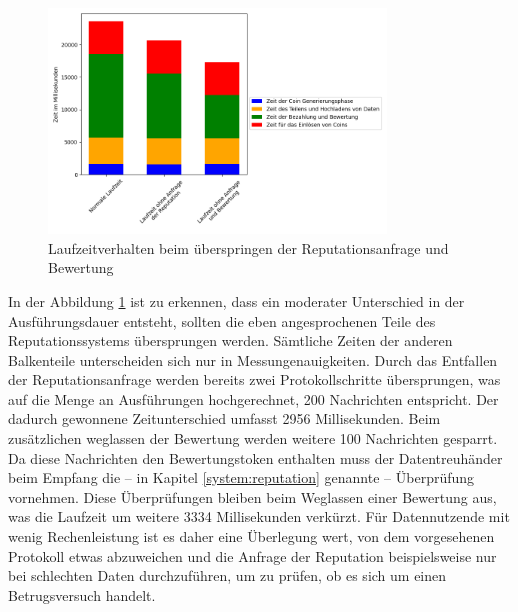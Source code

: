 \documentclass[
	fontsize=12pt,
	headings=small,
	parskip=half,           %
	bibliography=totoc,
	numbers=noenddot,       %
	open=any,               %
]{scrreprt}
\begin{document}
\begin{figure}[h]
    \caption{Laufzeitverhalten beim überspringen der Reputationsanfrage und Bewertung}
    \label{fig:win_noRep}
    \centering
    \includegraphics[width=0.8\textwidth]{figure_win_noRep.png}
\end{figure}
In der Abbildung \ref{fig:win_noRep} ist zu erkennen, dass ein moderater Unterschied in der Ausführungsdauer entsteht, sollten die eben angesprochenen Teile des Reputationssystems übersprungen werden. Sämtliche Zeiten der anderen Balkenteile unterscheiden sich nur in Messungenauigkeiten. Durch das Entfallen der Reputationsanfrage werden bereits zwei Protokollschritte übersprungen, was auf die Menge an Ausführungen hochgerechnet, 200 Nachrichten entspricht. Der dadurch gewonnene Zeitunterschied umfasst 2956 Millisekunden. Beim zusätzlichen weglassen der Bewertung werden weitere 100 Nachrichten gesparrt. Da diese Nachrichten den Bewertungstoken enthalten muss der Datentreuhänder beim Empfang die -- in Kapitel \ref{system:reputation} genannte -- Überprüfung vornehmen. Diese Überprüfungen bleiben beim Weglassen einer Bewertung aus, was die Laufzeit um weitere 3334 Millisekunden verkürzt. Für Datennutzende mit wenig Rechenleistung ist es daher eine Überlegung wert, von dem vorgesehenen Protokoll etwas abzuweichen und die Anfrage der Reputation beispielsweise nur bei schlechten Daten durchzuführen, um zu prüfen, ob es sich um einen Betrugsversuch handelt.
\end{document}
